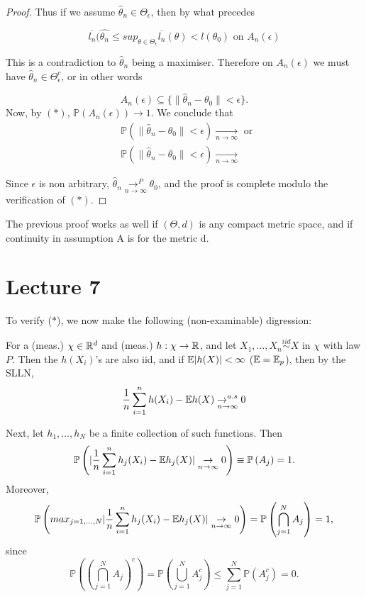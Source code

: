\documentclass[a4paper]{article}
\begin{document}
\begin{proof}
	Thus if we assume $\hat{\theta}_n \in \Theta_{\epsilon}$, then by what precedes

	\[
		\overline{l_n}(\hat{\theta_n} \le  sup_{\theta \in \Theta_{\epsilon}} \overline{l_n}(\theta) < l(\theta_0) \text{ on } A_n(\epsilon)
	\]

	This is a contradiction to $\hat{\theta}_n$ being a maximiser. Therefore on $A_n(\epsilon)$ we must have  $\hat{\theta}_n \in  \Theta_{\epsilon}^{c}$, or in other words

	\[
		A_n(\epsilon) \subseteq \{\| \hat{\theta}_n - \theta_0\| < \epsilon\} 
	.\] 
	Now, by $(\ast)$,  $\mathbb{P}\left( A_n(\epsilon) \right) \to 1$. We conclude that
	 \begin{align*}
		&\mathbb{P}\left( \| \hat{\theta}_n - \theta_0 \| < \epsilon  \right) \underset{n\to \infty}{\to } \text{ or } \\
		&\mathbb{P}\left( \| \hat{\theta}_n - \theta_0\| < \epsilon \right) \underset{n\to \infty}{\to }
	\end{align*}

	Since $\epsilon$ is non arbitrary,  $\hat{\theta}_n \underset{n\to \infty}{\to^{P} } \theta_0$, and the proof is complete modulo the verification of $(\ast)$.
\end{proof}

\begin{remark}
	The previous proof works as well if $(\Theta, d)$ is any compact metric space, and if continuity in assumption A is for the metric d.
\end{remark}

\section{Lecture 7}

To verify ($\ast$), we now make the following (non-examinable) digression:

For a (meas.) $\chi \in \mathbb{R}^{d}$ and (meas.) $h: \chi \to \mathbb{R}$, and let $X_1, \ldots, X_n \stackrel{iid}{\sim} X$ in $\chi$ with law $P$. Then the $h(X_i)$'s are also iid, and if $\mathbb{E} |h(X)| < \infty$ ($\mathbb{E} = \mathbb{E}_p$), then by the SLLN,
\[
	\frac{1}{n} \sum_{i=1}^{n} h(X_i) - \mathbb{E} h(X) \underset{n \to \infty}{\to^{a.s}} 0 
\] 

Next, let $h_1, \ldots, h_N$ be a finite collection of such functions. Then
\[
	\mathbb{P}\left( |\frac{1}{n} \sum_{i=1}^{n} h_j (X_i) - \mathbb{E} h_j (X)  | \underset{n \to \infty}{\to} 0 \right) \equiv \mathbb{P}\left( A_j \right) = 1.
\] 
Moreover,
\[
	\mathbb{P}\left( max_{j=1,\ldots,N} |\frac{1}{n} \sum_{i=1}^{n} h_j (X_i) - \mathbb{E} h_j (X)  | \underset{n \to \infty}{\to} 0 \right) = \mathbb{P}\left( \bigcap_{j=1}^{N} A_j  \right) = 1,
\] since
\[
	\mathbb{P}\left( (\bigcap_{j=1}^{N}A_j)^{c}  \right) = \mathbb{P}\left( \bigcup_{j=1}^{N} A_j^{c}  \right) \le \sum_{j=1}^{N}\mathbb{P}\left( A_j^{c} \right) = 0.
\] 
\end{document}
